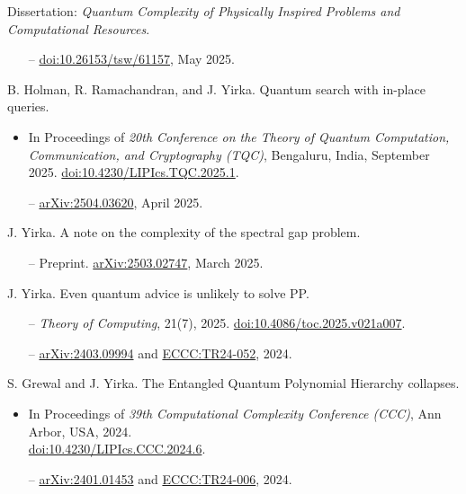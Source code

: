 \documentclass[11pt,letterpaper,serif]{moderncv}
\begin{document}
Dissertation: \textit{Quantum Complexity of Physically Inspired Problems and Computational Resources}.
\begin{adjustwidth}{.25in}{}
	\begin{itemize}
		\item[--] \href{https://doi.org/10.26153/tsw/61157}{doi:10.26153/tsw/61157}, May 2025.
	\end{itemize}
\end{adjustwidth}
\medskip


B. Holman, R. Ramachandran, and J. Yirka.\quad
Quantum search with in-place queries.
\begin{adjustwidth}{.25in}{}
	\begin{itemize}
		\item In Proceedings of \textit{20th Conference on the Theory of Quantum Computation, Communication, and Cryptography (TQC)}, Bengaluru, India, September 2025.\quad
		\href{https://doi.org/10.4230/LIPIcs.TQC.2025.1}{doi:10.4230/LIPIcs.TQC.2025.1}.
		\item[--] \href{https://arxiv.org/abs/2504.03620}{arXiv:2504.03620},
		April 2025.
	\end{itemize}
\end{adjustwidth}
\medskip

J. Yirka.\quad
A note on the complexity of the spectral gap problem.
\begin{adjustwidth}{.25in}{}
	\begin{itemize}
		\item[--] Preprint. \href{https://arxiv.org/abs/2503.02747}{arXiv:2503.02747},
		March 2025.
	\end{itemize}
\end{adjustwidth}
\medskip

J. Yirka.\quad
Even quantum advice is unlikely to solve \textup{PP}.
\begin{adjustwidth}{.25in}{}
	\begin{itemize}
		\item[--] \textit{Theory of Computing}, 21(7), 2025.\quad
		\href{http://doi.org/10.4086/toc.2025.v021a007}{doi:10.4086/toc.2025.v021a007}.
		\item[--] \href{https://arxiv.org/abs/2403.09994}{arXiv:2403.09994} and \href{https://eccc.weizmann.ac.il/report/2024/052/}{ECCC:TR24-052}, 2024.
	\end{itemize}
\end{adjustwidth}
\medskip

S. Grewal and J. Yirka.\quad
The Entangled Quantum Polynomial Hierarchy collapses.
\begin{adjustwidth}{.25in}{}
	\begin{itemize}
		\item In Proceedings of \textit{39th Computational Complexity Conference (CCC)}, Ann Arbor, USA, 2024.\quad
		\\
		\href{https://doi.org/10.4230/LIPIcs.CCC.2024.6}{doi:10.4230/LIPIcs.CCC.2024.6}.
		\item[--] \href{https://arxiv.org/abs/2401.01453}{arXiv:2401.01453} and \href{https://eccc.weizmann.ac.il/report/2024/006/}{ECCC:TR24-006}, 2024.
	\end{itemize}
\end{adjustwidth}
\medskip
\end{document}
